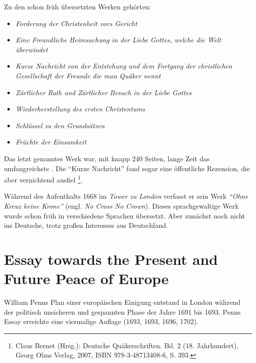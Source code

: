 \medskip

Zu den schon früh übersetzten Werken gehörten:
\begin{itemize}
 \item \textit{Forderung der Christenheit vors Gericht}
 \item \textit{Eine Freundliche Heimsuchung in der Liebe Gottes, welche die Welt
überwindet}
\item \textit{Kurze Nachricht von der Entstehung und dem Fortgang der
christlichen
Gesellschaft der Freunde die man Quäker nennt}
\item \textit{Zärtlicher Rath und Zärtlicher Besuch in der Liebe Gottes}
\item \textit{Wiederherstellung des ersten Christentums}
\item \textit{Schlüssel zu den Grundsätzen}
\item \textit{Früchte der Einsamkeit}
\end{itemize}

\medskip

Das letzt genanntes Werk war, mit knapp 240 Seiten, lange Zeit das
umfangreichste . Die "`Kurze Nachricht"' fand sogar eine öffentliche Rezension,
die aber vernichtend ausfiel \footnote{Claus Bernet (Hrsg.): Deutsche
Quäkerschriften. Bd. 2 (18. Jahrhundert), Georg Olms Verlag, 2007, ISBN
978-3-48713408-6, S. 393.}.

\medskip

Während des Aufenthalts 1668 im \textit{Tower zu London}  verfasst er sein Werk \textit{"`Ohne Kreuz keine Krone"'} (engl.
\textit{No Cross No Crown}). Dieses sprachgewaltige Werk wurde schon früh in
verschiedene Sprachen übersetzt. Aber zunächst noch nicht ins Deutsche, trotz
großen Interesses aus Deutschland.

\section{Essay towards the Present and Future Peace of Europe}


William Penns Plan einer europäischen Einigung entstand in London
 während der politisch unsicheren und gespannten Phase der
Jahre 1691 bis 1693. Penns Essay erreichte eine viermalige Auflage (1693, 1693,
1696, 1702).

\medskip

